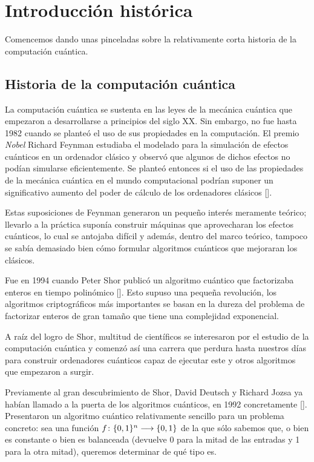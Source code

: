 \chapter{Introducción histórica}

Comencemos dando unas pinceladas sobre la relativamente corta historia de la computación cuántica.

\section{Historia de la computación cuántica}
La computación cuántica se sustenta en las leyes de la mecánica cuántica que empezaron a desarrollarse a principios del siglo XX. Sin embargo, no fue hasta 1982 cuando se planteó el uso de sus propiedades en la computación. El premio \textit{Nobel} Richard Feynman estudiaba el modelado para la simulación de efectos cuánticos en un ordenador clásico y observó que algunos de dichos efectos no podían simularse eficientemente. Se planteó entonces si el uso de las propiedades de la mecánica cuántica en el mundo computacional podrían suponer un significativo aumento del poder de cálculo de los ordenadores clásicos [\cite{feynman1982modeling}].

Estas suposiciones de Feynman generaron un pequeño interés meramente teórico; llevarlo a la práctica suponía construir máquinas que aprovecharan los efectos cuánticos, lo cual se antojaba difícil y además, dentro del marco teórico, tampoco se sabía demasiado bien cómo formular algoritmos cuánticos que mejoraran los clásicos.

Fue en 1994 cuando Peter Shor publicó un algoritmo cuántico que factorizaba enteros en tiempo polinómico [\cite{shor1994algorithms}]. Esto supuso una pequeña revolución, los algoritmos criptográficos más importantes se basan en la dureza del problema de factorizar enteros de gran tamaño que tiene una complejidad exponencial.

A raíz del logro de Shor, multitud de científicos se interesaron por el estudio de la computación cuántica y comenzó así una carrera que perdura hasta nuestros días para construir ordenadores cuánticos capaz de ejecutar este y otros algoritmos que empezaron a surgir.

Previamente al gran descubrimiento de Shor, David Deutsch y Richard Jozsa ya habían llamado a la puerta de los algoritmos cuánticos, en 1992 concretamente [\cite{deutsch1992rapid}]. Presentaron un algoritmo cuántico relativamente sencillo para un problema concreto: sea una función $f\colon \{0,1\}^n\longrightarrow \{0,1\}$ de la que sólo sabemos que, o bien es constante o bien es balanceada (devuelve 0 para la mitad de las entradas y 1 para la otra mitad), queremos determinar de qué tipo es.

